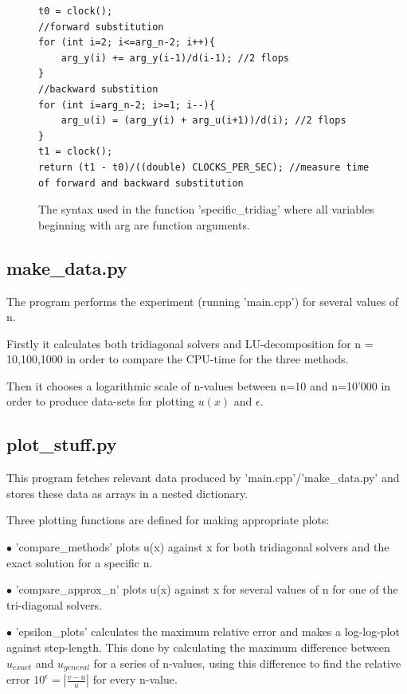 \documentclass[11pt,a4paper,notitlepage]{article}
\begin{document}
\begin{figure}[H]
\label{code:specific_syntax}
\lstset{style=c++style}
\begin{lstlisting}[frame=single]
t0 = clock();
//forward substitution
for (int i=2; i<=arg_n-2; i++){
	arg_y(i) += arg_y(i-1)/d(i-1); //2 flops
}
//backward substition
for (int i=arg_n-2; i>=1; i--){
    arg_u(i) = (arg_y(i) + arg_u(i+1))/d(i); //2 flops
}
t1 = clock();
return (t1 - t0)/((double) CLOCKS_PER_SEC); //measure time of forward and backward substitution
\end{lstlisting}
\caption{The syntax used in the function 'specific\_tridiag' where all variables beginning with arg are function arguments.}
\end{figure}

\subsection{make\_data.py}
The program performs the experiment (running 'main.cpp') for several values of n.

Firstly it calculates both tridiagonal solvers and LU-decomposition for n = 10,100,1000 in order to compare the CPU-time for the three methods.

Then it chooses a logarithmic scale of n-values between n=10 and n=10'000 in order to produce data-sets for plotting $u(x)$ and $\epsilon$.

\subsection{plot\_stuff.py}
This program fetches relevant data produced by 'main.cpp'/'make\_data.py' and stores these data as arrays in a nested dictionary.

Three plotting functions are defined for making appropriate plots:

$\bullet$ 'compare\_methods' plots u(x) against x for both tridiagonal solvers and the exact solution for a specific n.

$\bullet$ 'compare\_approx\_n' plots u(x) against x for several values of n for one of the tri-diagonal solvers.

$\bullet$ 'epsilon\_plots' calculates the maximum relative error and makes a log-log-plot against step-length. This done by calculating the maximum difference between $u_{exact}$ and $u_{general}$ for a series of n-values, using this difference to find the relative error $10^\epsilon = \left|\frac{v-u}{u}\right|$ for every n-value.
\end{document}
